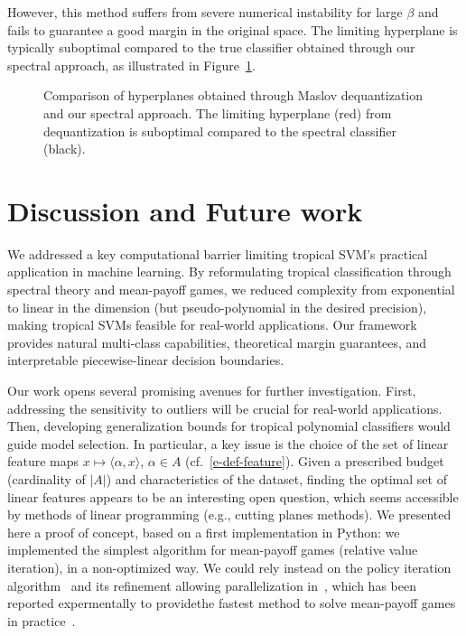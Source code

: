 \documentclass{article}
\def\<#1,#2>{\langle #1,#2\rangle}
\begin{document}
However, this method suffers from severe numerical instability for large $\beta$ and fails to guarantee a good margin in the original space. The limiting hyperplane is typically suboptimal compared to the true classifier obtained through our spectral approach, as illustrated in Figure~\ref{fig:maslov_dequantization}.

\begin{figure}[h]
    \centering
    \resizebox{0.5\textwidth}{!}{\clipbox{0.15\width{} 0.15\height{} 0.15\width{} 0.15\height{}}{}}
    \caption{Comparison of hyperplanes obtained through Maslov dequantization and our spectral approach. The limiting hyperplane (red) from dequantization is suboptimal compared to the spectral classifier (black).}
    \label{fig:maslov_dequantization}
\end{figure}

\section{Discussion and Future work}\label{sec:discussion}

We addressed a key computational barrier limiting tropical SVM's practical application in machine learning. By reformulating tropical classification through spectral theory and mean-payoff games, we reduced complexity from exponential to linear in the dimension (but pseudo-polynomial in the desired precision),
making tropical SVMs feasible for real-world applications.
Our framework provides natural multi-class capabilities, theoretical margin guarantees, and interpretable piecewise-linear decision boundaries.

Our work opens several promising avenues for further investigation. First, addressing the sensitivity to outliers will be crucial for real-world applications. Then, developing generalization bounds for tropical polynomial classifiers would guide model selection. In particular, a key issue is the choice of the set of linear feature maps $x\mapsto \<\alpha,x>$, $\alpha\in A$ (cf.\ \eqref{e-def-feature}). Given a prescribed budget (cardinality of $|A|$) and characteristics
of the dataset, finding the optimal set of linear features
appears to be an interesting open question, which seems accessible
by methods of linear programming (e.g., cutting planes methods).
We presented here a proof of concept, based on a first implementation in Python: we implemented the simplest algorithm for mean-payoff games
(relative value iteration), in a non-optimized way. We could rely instead on the policy iteration algorithm~\cite{DG-06} and its refinement allowing parallelization in~\cite{chaloupkathesis}, which has been reported expermentally to providethe fastest method to solve mean-payoff
games in practice~\cite{chaloupka}.
\end{document}
